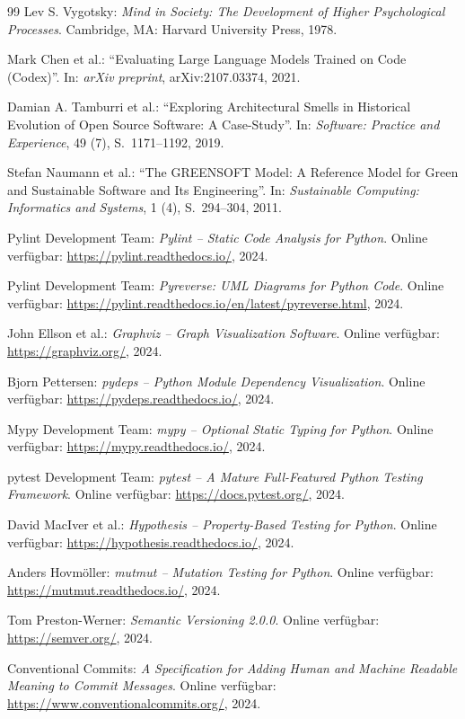 ﻿\documentclass[a4paper,12pt]{article}
\begin{document}
\begin{thebibliography}{99}
	Lev S. Vygotsky:
	\textit{Mind in Society: The Development of Higher Psychological Processes}.
	Cambridge, MA: Harvard University Press, 1978.
	
	Mark Chen et al.:
	\enquote{Evaluating Large Language Models Trained on Code (Codex)}.
	In: \textit{arXiv preprint}, arXiv:2107.03374, 2021.
	
	Damian A. Tamburri et al.:
	\enquote{Exploring Architectural Smells in Historical Evolution of Open Source
		Software: A Case-Study}.
	In: \textit{Software: Practice and Experience}, 49 (7), S.~1171--1192, 2019.
	
	Stefan Naumann et al.:
	\enquote{The GREENSOFT Model: A Reference Model for Green and Sustainable Software
		and Its Engineering}.
	In: \textit{Sustainable Computing: Informatics and Systems}, 1 (4), S.~294--304, 2011.
	
	Pylint Development Team:
	\textit{Pylint -- Static Code Analysis for Python}.
	Online verfügbar: \url{https://pylint.readthedocs.io/}, 2024.
	
	Pylint Development Team:
	\textit{Pyreverse: UML Diagrams for Python Code}.
	Online verfügbar: \url{https://pylint.readthedocs.io/en/latest/pyreverse.html}, 2024.
	
	John Ellson et al.:
	\textit{Graphviz -- Graph Visualization Software}.
	Online verfügbar: \url{https://graphviz.org/}, 2024.
	
	Bjorn Pettersen:
	\textit{pydeps -- Python Module Dependency Visualization}.
	Online verfügbar: \url{https://pydeps.readthedocs.io/}, 2024.
	
	Mypy Development Team:
	\textit{mypy -- Optional Static Typing for Python}.
	Online verfügbar: \url{https://mypy.readthedocs.io/}, 2024.
	
	pytest Development Team:
	\textit{pytest -- A Mature Full-Featured Python Testing Framework}.
	Online verfügbar: \url{https://docs.pytest.org/}, 2024.
	
	David MacIver et al.:
	\textit{Hypothesis -- Property-Based Testing for Python}.
	Online verfügbar: \url{https://hypothesis.readthedocs.io/}, 2024.
	
	Anders Hovmöller:
	\textit{mutmut -- Mutation Testing for Python}.
	Online verfügbar: \url{https://mutmut.readthedocs.io/}, 2024.
	
	Tom Preston-Werner:
	\textit{Semantic Versioning 2.0.0}.
	Online verfügbar: \url{https://semver.org/}, 2024.
	
	Conventional Commits:
	\textit{A Specification for Adding Human and Machine Readable Meaning to
		Commit Messages}.
	Online verfügbar: \url{https://www.conventionalcommits.org/}, 2024.
	
\end{thebibliography}
	
\end{document}
